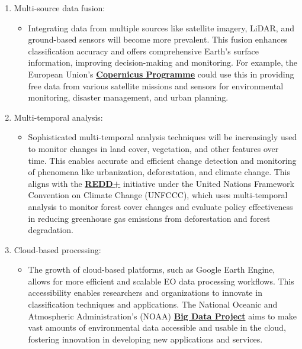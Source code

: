 \documentclass[
  letterpaper,
  DIV=11,
  numbers=noendperiod]{scrreprt}
\providecommand{\tightlist}{%
  \setlength{\itemsep}{0pt}\setlength{\parskip}{0pt}}\usepackage{longtable,booktabs,array}
\begin{document}
\begin{enumerate}
\def\labelenumi{\arabic{enumi}.}
\tightlist
\item
  Multi-source data fusion:

  \begin{itemize}
  \tightlist
  \item
    Integrating data from multiple sources like satellite imagery,
    LiDAR, and ground-based sensors will become more prevalent. This
    fusion enhances classification accuracy and offers comprehensive
    Earth's surface information, improving decision-making and
    monitoring. For example, the European Union's
    \href{https://www.copernicus.eu/en}{\textbf{Copernicus Programme}}
    could use this in providing free data from various satellite
    missions and sensors for environmental monitoring, disaster
    management, and urban planning.
  \end{itemize}
\item
  Multi-temporal analysis:

  \begin{itemize}
  \tightlist
  \item
    Sophisticated multi-temporal analysis techniques will be
    increasingly used to monitor changes in land cover, vegetation, and
    other features over time. This enables accurate and efficient change
    detection and monitoring of phenomena like urbanization,
    deforestation, and climate change. This aligns with the
    \href{https://unfccc.int/topics/land-use/workstreams/reddplus}{\textbf{REDD+}}
    initiative under the United Nations Framework Convention on Climate
    Change (UNFCCC), which uses multi-temporal analysis to monitor
    forest cover changes and evaluate policy effectiveness in reducing
    greenhouse gas emissions from deforestation and forest degradation.
  \end{itemize}
\item
  Cloud-based processing:

  \begin{itemize}
  \tightlist
  \item
    The growth of cloud-based platforms, such as Google Earth Engine,
    allows for more efficient and scalable EO data processing workflows.
    This accessibility enables researchers and organizations to innovate
    in classification techniques and applications. The National Oceanic
    and Atmospheric Administration's (NOAA)
    \href{https://ncics.org/data/noaa-big-data-project/}{\textbf{Big
    Data Project}} aims to make vast amounts of environmental data
    accessible and usable in the cloud, fostering innovation in
    developing new applications and services.
  \end{itemize}
\end{enumerate}
\end{document}
